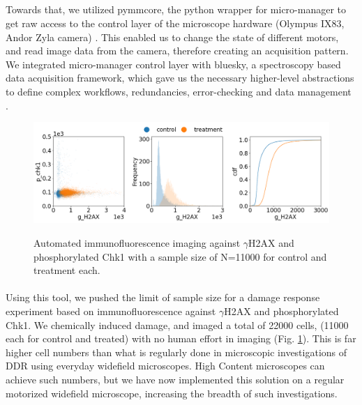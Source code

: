 \subsection{}


\paragraph*{} Towards that, we utilized pymmcore, the python wrapper for micro-manager to get raw access to the control layer of the microscope hardware (Olympus IX83, Andor Zyla camera) \cite{edelstein2014advanced}. This enabled us to change the state of different motors, and read image data from the camera, therefore creating an acquisition pattern. We integrated micro-manager control layer with bluesky, a spectroscopy based data acquisition framework, which gave us the necessary higher-level abstractions to define complex workflows, redundancies, error-checking and data management \cite{allan2019bluesky}.

\begin{figure}[H]
    {\hfill\includegraphics[clip, width=1\linewidth]{figures/ncs.png}\hspace*{\fill}}
    \caption{Automated immunofluorescence imaging against $\gamma$H2AX and phosphorylated Chk1 with a sample size of N=11000 for control and treatment each.}
    {\label{fig:ncs}}
\end{figure}

\paragraph*{} Using this tool, we pushed the limit of sample size for a damage response experiment based on immunofluorescence against $\gamma$H2AX and phosphorylated Chk1. We chemically induced damage, and imaged a total of 22000 cells, (11000 each for control and treated) with no human effort in imaging (Fig. \ref{fig:ncs}). This is far higher cell numbers than what is regularly done in microscopic investigations of DDR using everyday widefield microscopes. High Content microscopes can achieve such numbers, but we have now implemented this solution on a regular motorized widefield microscope, increasing the breadth of such investigations.

